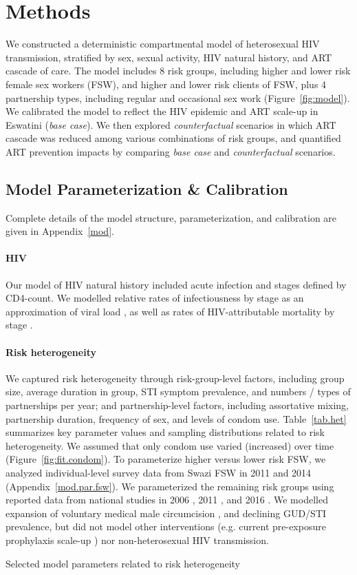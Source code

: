 \section{Methods}\label{meth}
We constructed a deterministic compartmental model of heterosexual HIV transmission,
stratified by sex, sexual activity, HIV natural history, and ART cascade of care.
The model includes 8 risk groups,
including higher and lower risk female sex workers (FSW), and higher and lower risk clients of FSW,
plus 4 partnership types, including regular and occasional sex work (Figure~\ref{fig:model}).
We calibrated the model to reflect the HIV epidemic and ART scale-up in Eswatini (\emph{base case}).
We then explored \emph{counterfactual} scenarios in which
ART cascade was reduced among various combinations of risk groups,
and quantified ART prevention impacts by comparing \emph{base case} and \emph{counterfactual} scenarios.
\subsection{Model Parameterization \& Calibration}\label{meth.param}
Complete details of the model structure, parameterization, and calibration are given in Appendix~\ref{mod}.
\paragraph{HIV}
Our model of HIV natural history included acute infection and stages defined by CD4-count.
We modelled relative rates of infectiousness by stage
as an approximation of viral load \cite{Wawer2005,Boily2009,Donnell2010},
as well as rates of HIV-attributable mortality by stage \cite{Badri2006,Anglaret2012,Mangal2017}.
\paragraph{Risk heterogeneity}
We captured risk heterogeneity through risk-group-level factors, including
group size, average duration in group, STI symptom prevalence, and numbers / types of partnerships per year;
and partnership-level factors, including
assortative mixing, partnership duration, frequency of sex, and levels of condom use.
Table~\ref{tab.het} summarizes key parameter values and sampling distributions related to risk heterogeneity.
We assumed that only condom use varied (increased) over time (Figure~\ref{fig:fit.condom}).
To parameterize higher versus lower risk FSW, we analyzed individual-level survey data
from Swazi FSW in 2011 \cite{Baral2014} and 2014 \cite{EswKP2014} (Appendix~\ref{mod.par.fsw}).
We parameterized the remaining risk groups using reported data from national studies in
2006 \cite{SDHS2006}, 2011 \cite{SHIMS1}, and 2016 \cite{SHIMS2}.
We modelled expansion of voluntary medical male circumcision \cite{SHIMS2},
and declining GUD/STI prevalence,
but did not model other interventions (e.g. current pre-exposure prophylaxis scale-up \cite{EswCOP21})
nor non-heterosexual HIV transmission.
\begin{table}
  \centering
  \caption{Selected model parameters related to risk heterogeneity}
  
  \label{tab.het}
\end{table}
